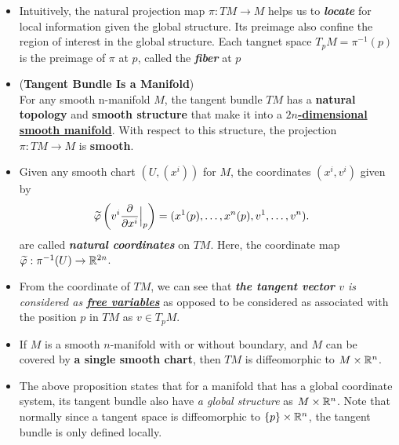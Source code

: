 \documentclass[11pt]{article}
\begin{document}
\begin{itemize}
\item \begin{remark}
Intuitively, the natural projection map $\pi: TM \rightarrow M$ helps us to \emph{\textbf{locate}} for local information given the global structure. Its preimage also confine the region of interest in the global structure. Each tangnet space $T_pM = \pi^{-1}(p)$ is the preimage of $\pi$ at $p$, called the \emph{\textbf{fiber}} at $p$ 
\end{remark}


\item 
\begin{proposition} (\textbf{Tangent Bundle Is a Manifold}) \citep{lee2003introduction}\\
For any smooth n-manifold $M$, the tangent bundle $TM$ has a \textbf{natural topology} and \textbf{smooth structure} that make it into a \underline{\textbf{$2n$-dimensional smooth manifold}}. With respect to this structure, the projection $\pi: TM \rightarrow M$ is \textbf{smooth}.
\end{proposition}

\item \begin{definition}
Given any smooth chart $(U, (x^i))$ for $M$,  the coordinates $(x^i, v^i)$ given by 
\begin{align*}
\widetilde{\varphi}\left(v^{i}\frac{\partial }{ \partial x^{i}}\Bigr|_{p}\right) &= (x^{1}(p), \ldots, x^{n}(p), v^{1}, \ldots, v^{n}). 
\end{align*}  are called \emph{\textbf{natural coordinates}} on $TM$. Here, the coordinate map $\widetilde{\varphi}: \pi^{-1}(U) \rightarrow {\mathbb R}^{2n}$.
\end{definition}

\item \begin{remark}
From the coordinate of $TM$, we can see that \emph{\textbf{the tangent vector} $v$ is considered as \underline{\textbf{free variables}}} as opposed to be considered as associated with the position $p$  in $TM$  as $v \in T_pM$. 
\end{remark}

\item \begin{proposition}
If $M$ is a smooth $n$-manifold with or without boundary, and $M$ can be covered by \textbf{a single smooth chart}, then $TM$ is diffeomorphic to $M \times {\mathbb R}^n$.
\end{proposition}

\item \begin{remark}
The above proposition states that for a manifold that has a global coordinate system, its tangent bundle also have \emph{a global structure} as $M \times {\mathbb R}^n$. Note that normally since a tangent space is diffeomorphic to $\left\{p\right\} \times {\mathbb R}^{n}$, the tangent bundle is only defined locally.
\end{remark}


\end{itemize}
\end{document}
